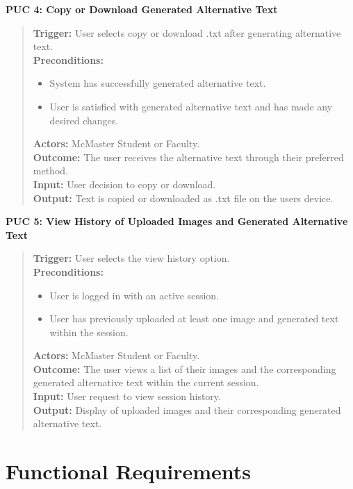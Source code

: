 \documentclass[12pt]{article}
\begin{document}
\textbf{PUC 4: Copy or Download Generated Alternative Text }
\begin{quote}
  \textbf{Trigger:} User selects copy or download .txt after
  generating alternative text.\\
  \textbf{Preconditions:}
  \begin{itemize}
    \item System has successfully generated alternative text.
    \item User is satisfied with generated alternative text and has
      made any desired changes.
  \end{itemize}
  \textbf{Actors:} McMaster Student or Faculty. \\
  \textbf{Outcome:} The user receives the alternative text through
  their preferred method. \\
  \textbf{Input:} User decision to copy or download.\\
  \textbf{Output:} Text is copied or downloaded as .txt file on the
  users device.
\end{quote}
\textbf{PUC 5: View History of Uploaded Images and Generated Alternative Text}
\begin{quote}
  \textbf{Trigger:} User selects the view history option.\\
  \textbf{Preconditions:}
  \begin{itemize}
    \item User is logged in with an active session.
    \item User has previously uploaded at least one image and
      generated text within the session.
  \end{itemize}
  \textbf{Actors:} McMaster Student or Faculty.\\
  \textbf{Outcome:} The user views a list of their images and the
  corresponding generated alternative text within the current session. \\
  \textbf{Input:} User request to view session history.\\
  \textbf{Output:} Display of uploaded images and their corresponding
  generated alternative text.\\
\end{quote}

\section{Functional Requirements}
\end{document}
